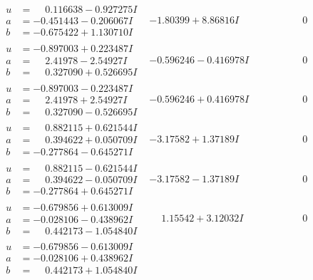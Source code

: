 \documentclass[1p]{elsarticle_modified}
\theoremstyle{definition}
\begin{document}
$$\begin{array}{c|c|c}
\begin{aligned}
u &= \phantom{-}0.116638 - 0.927275 I \\
a &= -0.451443 - 0.206067 I \\
b &= -0.675422 + 1.130710 I\end{aligned}
 & -1.80399 + 8.86816 I & \phantom{-0.000000 } 0 \\ \hline\begin{aligned}
u &= -0.897003 + 0.223487 I \\
a &= \phantom{-}2.41978 - 2.54927 I \\
b &= \phantom{-}0.327090 + 0.526695 I\end{aligned}
 & -0.596246 - 0.416978 I & \phantom{-0.000000 } 0 \\ \hline\begin{aligned}
u &= -0.897003 - 0.223487 I \\
a &= \phantom{-}2.41978 + 2.54927 I \\
b &= \phantom{-}0.327090 - 0.526695 I\end{aligned}
 & -0.596246 + 0.416978 I & \phantom{-0.000000 } 0 \\ \hline\begin{aligned}
u &= \phantom{-}0.882115 + 0.621544 I \\
a &= \phantom{-}0.394622 + 0.050709 I \\
b &= -0.277864 - 0.645271 I\end{aligned}
 & -3.17582 + 1.37189 I & \phantom{-0.000000 } 0 \\ \hline\begin{aligned}
u &= \phantom{-}0.882115 - 0.621544 I \\
a &= \phantom{-}0.394622 - 0.050709 I \\
b &= -0.277864 + 0.645271 I\end{aligned}
 & -3.17582 - 1.37189 I & \phantom{-0.000000 } 0 \\ \hline\begin{aligned}
u &= -0.679856 + 0.613009 I \\
a &= -0.028106 - 0.438962 I \\
b &= \phantom{-}0.442173 - 1.054840 I\end{aligned}
 & \phantom{-}1.15542 + 3.12032 I & \phantom{-0.000000 } 0 \\ \hline\begin{aligned}
u &= -0.679856 - 0.613009 I \\
a &= -0.028106 + 0.438962 I \\
b &= \phantom{-}0.442173 + 1.054840 I\end{aligned}

\end{array}$$
\end{document}
